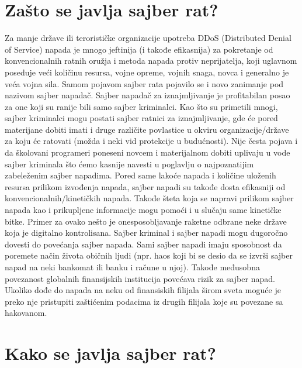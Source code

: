 \documentclass[a4paper]{article}
\begin{document}
{\newpage

 



\section{Zašto se javlja sajber rat?}
\label{slike_i_tabele}


Za manje države ili terorističke organizacije upotreba DDoS (Distributed Denial of Service) napada je mnogo jeftinija (i takođe efikasnija) za pokretanje od konvencionalnih ratnih oružja i metoda napada protiv neprijatelja, koji uglavnom poseduje veći količinu resursa, vojne opreme, vojnih snaga, novca i generalno je veća vojna sila. Samom pojavom sajber rata pojavilo se i novo zanimanje pod nazivom sajber napadač. Sajber napadač za iznajmljivanje je profitabilan posao za one koji su ranije bili samo sajber kriminalci.
Kao što su primetili mnogi, sajber kriminalci mogu postati sajber ratnici za iznajmljivanje, gde će pored materijane dobiti imati i druge različite povlastice u okviru organizacije/države za koju će ratovati (možda i neki vid protekcije u budućnosti).
Nije česta pojava i da školovani programeri poneseni novcem i materijalnom dobiti uplivaju u vode sajber kriminala što ćemo kasnije navesti u poglavlju o najpoznatijim zabeleženim sajber napadima. Pored same lakoće napada i količine uloženih resursa prilikom izvođenja napada, sajber napadi su takođe dosta efikasniji od konvencionalnih/kinetičkih napada. Takođe šteta koja se napravi prilikom sajber napada kao i prikupljene informacije mogu pomoći i u slučaju same kinetičke bitke. Primer za ovako nešto je onesposobljavanje raketne odbrane neke države koja je digitalno kontrolisana.
Sajber kriminal i sajber napadi mogu dugoročno dovesti do povećanja sajber napada.
Sami sajber napadi imaju sposobnost da poremete način života običnih ljudi (npr. haos koji bi se desio da se izvrši sajber napad na neki bankomat ili banku i račune u njoj). Takođe međusobna povezanost globalnih finansijskih institucija povećava rizik za sajber napad.
Ukoliko dođe do napada na neku od finansiskih filijala širom sveta moguće je preko nje pristupiti zaštićenim podacima iz drugih filijala koje su povezane sa hakovanom.








\section{Kako se javlja sajber rat?}
\label{sec:naslov1}


}
\end{document}
